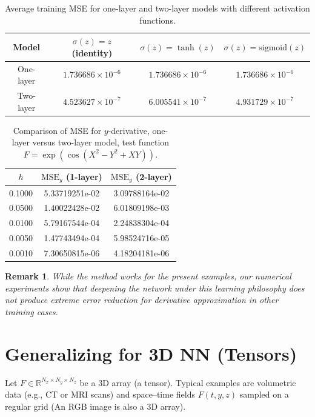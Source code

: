 \documentclass[pdflatex,sn-mathphys-num]{sn-jnl}%
\newcommand{\rev}[1]{\textcolor{red}{#1}}
\theoremstyle{thmstyleone}%
\theoremstyle{thmstyletwo}%
\newtheorem{remark}{Remark}%
\theoremstyle{thmstylethree}%
\begin{document}
{\begin{table}[htbp]
\centering
\caption{Average training MSE for one-layer and two-layer models with different activation functions.}
\begin{tabular}{cccc}
Model & $\sigma(z)=z$ (identity) & $\sigma(z)=\tanh(z)$ & $\sigma(z)=\text{sigmoid}(z)$ \\
\hline
One-layer & $1.736686\times 10^{-6}$ & $1.736686\times 10^{-6}$ & $1.736686\times 10^{-6}$ \\
Two-layer & $4.523627\times 10^{-7}$ & $6.005541\times 10^{-7}$ & $4.931729\times 10^{-7}$
\end{tabular}
\label{tab:table7}
\end{table}

\begin{table}[htbp]
\centering
\caption{Comparison of MSE for $y$-derivative, one-layer versus two-layer model, test function $F=\exp(\cos(X^2-Y^2+XY))$.}
\begin{tabular}{ccc}
$h$ & $\text{MSE}_y$ (1-layer) & $\text{MSE}_y$ (2-layer) \\
\hline
0.1000 & 5.33719251e-02 & 3.09788164e-02 \\
0.0500 & 1.40022428e-02 & 6.01809198e-03 \\
0.0100 & 5.79167544e-04 & 2.24838304e-04 \\
0.0050 & 1.47743494e-04 & 5.98524716e-05 \\
0.0010 & 7.30650815e-06 & 4.18204181e-06 \\
\end{tabular}
\label{tab:8}
\end{table}
 
\begin{remark}
While the method works for the present examples, our numerical experiments show that deepening the network under this learning philosophy does not produce extreme error reduction for derivative approximation in other training cases.
\end{remark}

\section{Generalizing for 3D NN (Tensors)}\rev{\label{sec:3dnn}}


Let  $F\in\mathbb{R}^{N_x\times N_y\times N_z}$  be a 3D array (a tensor). Typical examples are volumetric data (e.g., CT or MRI scans) and space--time fields $F(t,y,z)$ sampled on a regular grid (An RGB image is also a 3D array).


}
\end{document}

